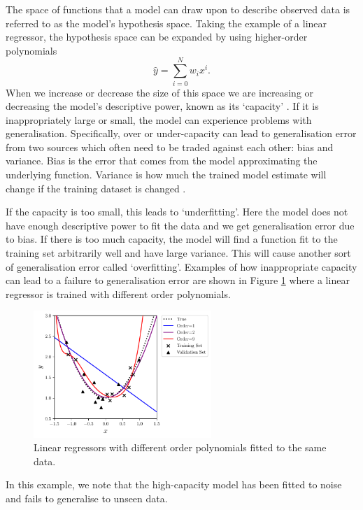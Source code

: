 The space of functions that a model can draw upon to describe observed data is referred to as the model's hypothesis space.
Taking the example of a linear regressor, the hypothesis space can be expanded by using higher-order polynomials
\begin{equation}
    \hat{y} = \sum_{i=0}^{N}w_{i}x^{i}.
\end{equation}
When we increase or decrease the size of this space we are increasing or decreasing the model's descriptive power, known as its `capacity' \cite{DeepLearningBook}. If it is inappropriately large or small, the model can experience problems with generalisation.
Specifically, over or under-capacity can lead to generalisation error from two sources which often need to be traded against each other: bias and variance. Bias is the error that comes from the model approximating the underlying function. Variance is how much the trained model estimate will change if the training dataset is changed \cite{DeepLearningBook}. 

If the capacity is too small, this leads to `underfitting'. Here the model does not have enough descriptive power to fit the data and we get generalisation error due to bias. If there is too much capacity, the model will find a function fit to the training set arbitrarily well and have large variance. This will cause another sort of generalisation error called `overfitting'. Examples of how inappropriate capacity can lead to a failure to generalisation error are shown in Figure \ref{fig:machine_learning:overfitting} where a linear regressor is trained with different order polynomials. 
\begin{figure}[h!]
        \includegraphics[width=0.6\textwidth]{figures/machine_learning/capacity.pdf}
    \caption{Linear regressors with different order polynomials fitted to the same data. }
        \label{fig:machine_learning:overfitting}
\end{figure}
In this example, we note that the high-capacity model has been fitted to noise and fails to generalise to unseen data. 

